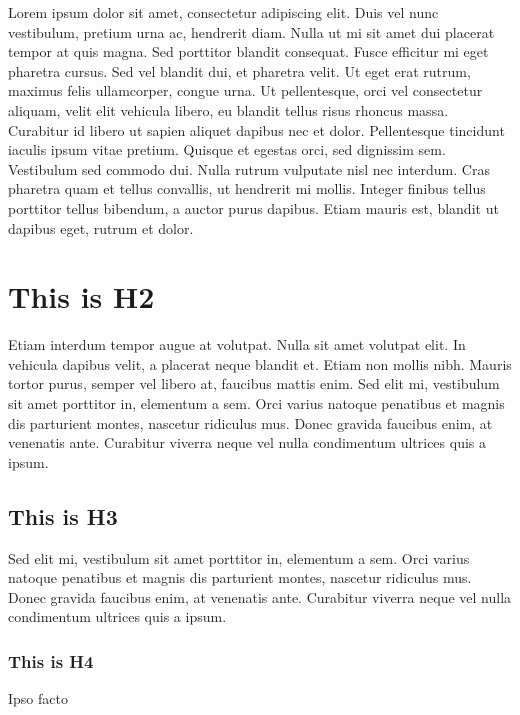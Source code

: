 

\pagestyle{empty}
\sphinxmaketitle
\pagestyle{plain}
\sphinxtableofcontents
\pagestyle{normal}
\label{\detokenize{intro::doc}}


\sphinxAtStartPar
Lorem ipsum dolor sit amet, consectetur adipiscing elit. Duis vel nunc vestibulum, pretium urna ac, hendrerit diam. Nulla ut mi sit amet dui placerat tempor at quis magna. Sed porttitor blandit consequat. Fusce efficitur mi eget pharetra cursus. Sed vel blandit dui, et pharetra velit. Ut eget erat rutrum, maximus felis ullamcorper, congue urna. Ut pellentesque, orci vel consectetur aliquam, velit elit vehicula libero, eu blandit tellus risus rhoncus massa. Curabitur id libero ut sapien aliquet dapibus nec et dolor. Pellentesque tincidunt iaculis ipsum vitae pretium. Quisque et egestas orci, sed dignissim sem. Vestibulum sed commodo dui. Nulla rutrum vulputate nisl nec interdum. Cras pharetra quam et tellus convallis, ut hendrerit mi mollis. Integer finibus tellus porttitor tellus bibendum, a auctor purus dapibus. Etiam mauris est, blandit ut dapibus eget, rutrum et dolor.


\chapter{This is H2}
\label{\detokenize{intro:this-is-h2}}
\sphinxAtStartPar
Etiam interdum tempor augue at volutpat. Nulla sit amet volutpat elit. In vehicula dapibus velit, a placerat neque blandit et. Etiam non mollis nibh. Mauris tortor purus, semper vel libero at, faucibus mattis enim. Sed elit mi, vestibulum sit amet porttitor in, elementum a sem. Orci varius natoque penatibus et magnis dis parturient montes, nascetur ridiculus mus. Donec gravida faucibus enim, at venenatis ante. Curabitur viverra neque vel nulla condimentum ultrices quis a ipsum.


\section{This is H3}
\label{\detokenize{intro:this-is-h3}}
\sphinxAtStartPar
Sed elit mi, vestibulum sit amet porttitor in, elementum a sem. Orci varius natoque penatibus et magnis dis parturient montes, nascetur ridiculus mus. Donec gravida faucibus enim, at venenatis ante. Curabitur viverra neque vel nulla condimentum ultrices quis a ipsum.


\subsection{This is H4}
\label{\detokenize{intro:this-is-h4}}
\sphinxAtStartPar
Ipso facto


